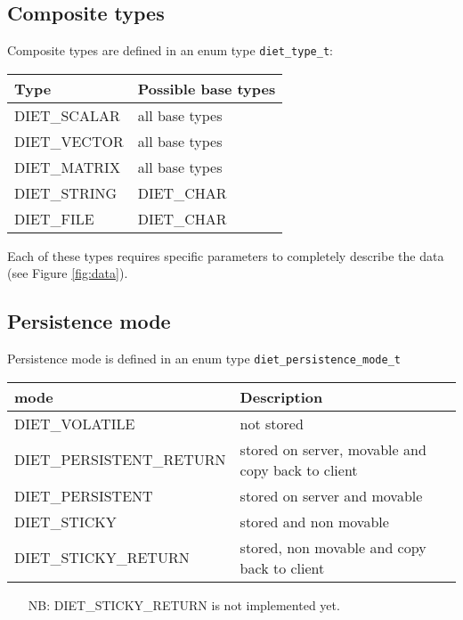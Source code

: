\subsection{Composite types}
\label{ssec:complex}

Composite types are defined in an enum type \texttt{diet\_type\_t}:
\begin{center}
\footnotesize
\begin{tabular}{|l|l|}
\hline
\textbf{Type}&\textbf{Possible base types}\\
\hline
\textsf{DIET\_SCALAR} & all base types\\
\textsf{DIET\_VECTOR} & all base types\\
\textsf{DIET\_MATRIX} & all base types\\
\textsf{DIET\_STRING} & \textsf{DIET\_CHAR}\\
\textsf{DIET\_FILE}   & \textsf{DIET\_CHAR}\\
\hline
\end{tabular}
\end{center}

Each of these types requires specific parameters to completely describe the
data (see Figure \ref{fig:data}).


\subsection{Persistence mode}
\label{ssec:persismode}
Persistence mode is defined in an enum type \texttt{diet\_persistence\_mode\_t}

\begin{center}
\footnotesize
\begin{tabular}{|l|l|}
\hline
\textbf{mode}&\textbf{Description}\\
\hline
\textsf{DIET\_VOLATILE} & not stored\\
\textsf{DIET\_PERSISTENT\_RETURN} & stored on server, movable and copy back to client\\
\textsf{DIET\_PERSISTENT} & stored on server and movable\\
\textsf{DIET\_STICKY} & stored and non movable\\
\textsf{DIET\_STICKY\_RETURN} & stored, non movable and copy back to client\\
\hline
\end{tabular}
\end{center}

\begin{itemize}
\item[NB:] \textsf{DIET\_STICKY\_RETURN} is not implemented yet.
\end{itemize}

